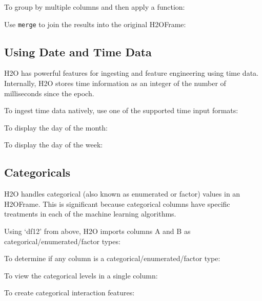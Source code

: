 {To group by multiple columns and then apply a function:


Use {\texttt{merge}} to join the results into the original H2OFrame:


\subsection{Using Date and Time Data} 
H2O has powerful features for ingesting and feature engineering using time data.  Internally, H2O
stores time information as an integer of the number of milliseconds since the epoch.

To ingest time data natively, use one of the supported time input formats:


To display the day of the month:


To display the day of the week:


\subsection{Categoricals}
H2O handles categorical (also known as enumerated or factor) values in an H2OFrame.  This is significant because categorical
columns have specific treatments in each of the machine learning algorithms.

Using `df12' from above, H2O imports columns A and B as categorical/enumerated/factor types:


To determine if any column is a categorical/enumerated/factor type:


To view the categorical levels in a single column:


To create categorical interaction features:


}
